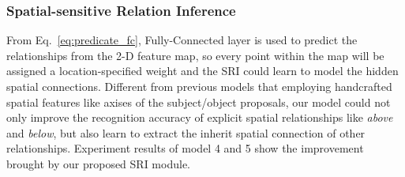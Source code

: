 \documentclass[runningheads]{llncs}
\begin{document}
\subsubsection{Spatial-sensitive Relation Inference}
From Eq.~\ref{eq:predicate_fc}, Fully-Connected layer is used to predict the relationships from the 2-D feature map, so every point within the map will be assigned a location-specified weight and the SRI could learn to model the hidden spatial connections. Different from previous models that employing handcrafted spatial features like axises of the subject/object proposals, our model could not only improve the recognition accuracy of explicit spatial relationships like \emph{above} and \emph{below}, but also learn to extract the inherit spatial connection of other relationships. Experiment results of model 4 and 5 show the improvement brought by our proposed SRI module. 
\end{document}

